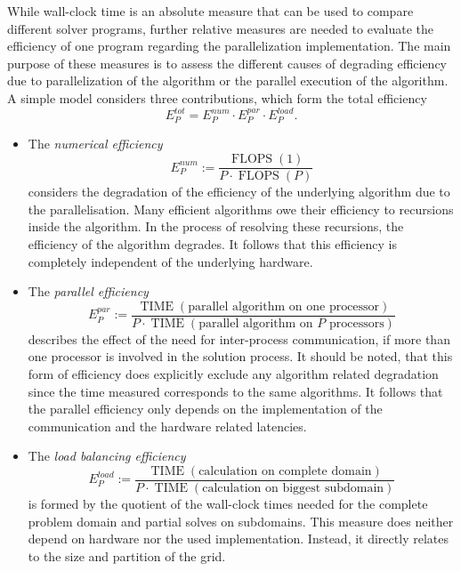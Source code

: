 While wall-clock time is an absolute measure that can be used to compare different solver programs, further relative measures are needed to evaluate the efficiency of one program regarding the parallelization implementation. The main purpose of these measures is to assess the different causes of degrading efficiency due to parallelization of the algorithm or the parallel execution of the algorithm. A simple model \cite{ferziger02,schaefer99} considers three contributions, which form the total efficiency
\begin{displaymath}
  E^{tot}_P = E^{num}_P \cdot E^{par}_P \cdot E^{load}_P.
\end{displaymath}
\begin{itemize}
  \item[] The \emph{numerical efficiency}
  \begin{displaymath} E^{num}_P := \frac{\operatorname{FLOPS}(1)}{P \cdot \operatorname{FLOPS}(P)}\end{displaymath} 
    considers the degradation of the efficiency of the underlying algorithm due to the parallelisation. Many efficient algorithms owe their efficiency to recursions inside the algorithm. In the process of resolving these recursions, the efficiency of the algorithm degrades. It follows that this efficiency is completely independent of the underlying hardware.
  \item[] The \emph{parallel efficiency}
    \begin{displaymath} E^{par}_P :=\frac{\operatorname{TIME}(\text{parallel algorithm on one processor})}{P \cdot \operatorname{TIME}(\text{parallel algorithm on \(P\) processors})} \end{displaymath} 
      describes the effect of the need for inter-process communication, if more than one processor is involved in the solution process. It should be noted, that this form of efficiency does explicitly exclude any algorithm related degradation since the time measured corresponds to the same algorithms. It follows that the parallel efficiency only depends on the implementation of the communication and the hardware related latencies.
  \item[] The \emph{load balancing efficiency} 
    \begin{displaymath} E^{load}_P :=\frac{\operatorname{TIME}(\text{calculation on complete domain})}{P \cdot \operatorname{TIME}(\text{calculation on biggest subdomain})} \end{displaymath}
       is formed by the quotient of the wall-clock times needed for the complete problem domain and partial solves on subdomains. This measure does neither depend on hardware nor the used implementation. Instead, it directly relates to the size and partition of the grid. 
\end{itemize}

